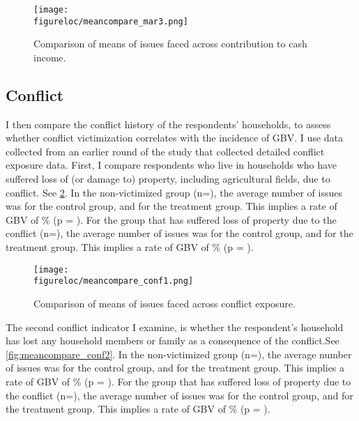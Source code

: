 \documentclass[11pt,a4paper]{scrartcl} %
\newcommand{\figureloc}{C:/Users/Koen/Dropbox/PhD/Papers/CongoGBV/Figures}
\begin{document}
\begin{figure}[H]
  \texttt{[image: \\figureloc/meancompare\_mar3.png]}
  \caption{Comparison of means of issues faced across contribution to cash income.}
  \label{fig:meancompare_mar3}
\end{figure}

\subsection*{Conflict}
I then compare the conflict history of the respondents' households, to assess whether conflict victimization correlates with the incidence of GBV. I use data collected from an earlier round of the study that collected detailed conflict exposure data. First, I compare respondents who live in households who have suffered loss of (or damage to) property, including agricultural fields, due to conflict. See \ref{fig:meancompare_conf1}. In the non-victimized group (n=), the average number of issues was  for the control group, and  for the treatment group. This implies a rate of GBV of \% (p = ). For the group that has suffered loss of property due to the conflict (n=), the average number of issues was  for the control group, and  for the treatment group. This implies a rate of GBV of \% (p = ).

\begin{figure}[H]
  \texttt{[image: \\figureloc/meancompare\_conf1.png]}
  \caption{Comparison of means of issues faced across conflict exposure.}
  \label{fig:meancompare_conf1}
\end{figure}

The second conflict indicator I examine, is whether the respondent's household has lost any household members or family as a consequence of the conflict.See \ref{fig:meancompare_conf2}. In the non-victimized group (n=), the average number of issues was  for the control group, and  for the treatment group. This implies a rate of GBV of \% (p = ). For the group that has suffered loss of property due to the conflict (n=), the average number of issues was  for the control group, and  for the treatment group. This implies a rate of GBV of \% (p = ).
\end{document}
